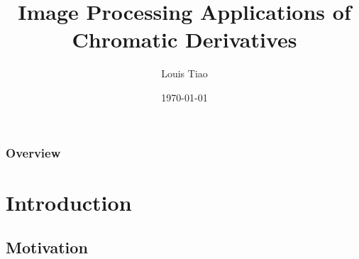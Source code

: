 \documentclass{beamer}
\title[Image Processing and Chromatic Derivatives]{Image Processing Applications of Chromatic Derivatives} %
\author{Louis Tiao} %
\institute[UNSW] %
{
School of Computer Science and Engineering, \\
The University of New South Wales \\ %
\medskip
\textit{louis.tiao@student.unsw.edu.au} %
}
\date{\today} %
\begin{document}
\begin{frame}
\titlepage %
\end{frame}

\begin{frame}
\frametitle{Overview} %
\tableofcontents %
\end{frame}


\section{Introduction} %

\subsection{Motivation} %
\end{document}
